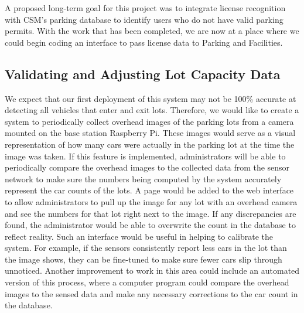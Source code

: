 \documentclass[11pt, oneside, fullpage, doublespace]{article}
\begin{document}
A proposed long-term goal for this project was to integrate license recognition with CSM's parking database to identify users who do not have valid parking permits. With the work that has been completed, we are now at a place where we could begin coding an interface to pass license data to Parking and Facilities.

\subsection{Validating and Adjusting Lot Capacity Data}
We expect that our first deployment of this system may not be 100\% accurate at detecting all vehicles that enter and exit lots. Therefore, we would like to create a system to periodically collect overhead images of the parking lots from a camera mounted on the base station Raspberry Pi. These images would serve as a visual representation of how many cars were actually in the parking lot at the time the image was taken. If this feature is implemented, administrators will be able to periodically compare the overhead images to the collected data from the sensor network to make sure the numbers being computed by the system accurately represent the car counts of the lots. A page would be added to the web interface to allow administrators to pull up the image for any lot with an overhead camera and see the numbers for that lot right next to the image. If any discrepancies are found, the administrator would be able to overwrite the count in the database to reflect reality. Such an interface would be useful in helping to calibrate the system. For example, if the sensors consistently report less cars in the lot than the image shows, they can be fine-tuned to make sure fewer cars slip through unnoticed. Another improvement to work in this area could include an automated version of this process, where a computer program could compare the overhead images to the sensed data and make any necessary corrections to the car count in the database.
\end{document}
